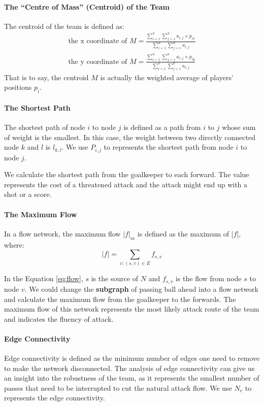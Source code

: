 \documentclass[12pt]{mcmthesis}
\begin{document}
	\paragraph{The ``Centre of Mass'' (Centroid) of the Team}
	The centroid of the team is defined as:
	\begin{align}\label{eq:mass}
		\text{the x coordinate of }M = \frac{\sum_{i = 1}^{n} \sum_{j = 1}^{n} a_{i, j} \times p_{ix}}{\sum_{i = 1}^{n} \sum_{j = 1}^{n} a_{i, j}}\nonumber\\
		\text{the y coordinate of }M = \frac{\sum_{i = 1}^{n} \sum_{j = 1}^{n} a_{i, j} \times p_{iy}}{\sum_{i = 1}^{n} \sum_{j = 1}^{n} a_{i, j}}
	\end{align}
	That is to say, the centroid $M$ is actually the weighted average of players' positions $p_{i}$.
	
	\paragraph{The Shortest Path}
	The shortest path of node $i$ to node $j$ is defined as a path from $i$ to $j$ whose sum of weight is the smallest. In this case, the weight between two directly connected node $k$ and $l$ is $l_{k, l}$. We use $P_{i, j}$ to represents the shortest path from node $i$ to node $j$.
	
	We calculate the shortest path from the goalkeeper to each forward. The value represents the cost of a threatened attack and the attack might end up with a shot or a score.
	
	\paragraph{The Maximum Flow}
	In a flow network, the maximum flow $|f|_m$ is defined as the maximum of |$f$|, where:
	\begin{equation}\label{eq:flow}
	|f| = \sum_{v:(s, v) \in E} f_{s, v}
	\end{equation}
	
	In the Equation \ref{eq:flow}, $s$ is the source of $N$ and $f_{s, v}$ is the flow from node $s$ to node $v$. We could change the \textbf{subgraph} of passing ball ahead into a flow network and calculate the maximum flow from the goalkeeper to the forwards. The maximum flow of this network represents the most likely attack route of the team and indicates the fluency of attack.~\cite{pena2012network}
	
	\paragraph{Edge Connectivity}
	Edge connectivity is defined as the minimum number of edges one need to remove to make the network disconnected. The analysis of edge connectivity can give us an insight into the robustness of the team, as it represents the smallest number of passes that need to be interrupted to cut the natural attack flow. We use $N_e$ to represents the edge connectivity.~\cite{pena2012network}
	
\end{document}
